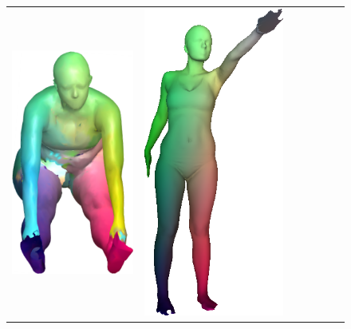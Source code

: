 \begin{figure}[b!]
\begin{tabular}[width=0.8\textwidth]{c|cc|cc|cc|}
		\includegraphics[scale=0.33]{figures/test_scan_035_test_scan_032.png}  & \includegraphics[scale=0.25]{figures/base01.png} &

\end{tabular}
\end{figure}
